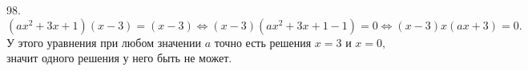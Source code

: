 98. $(ax^2+3x+1)(x-3)=(x-3)\Leftrightarrow (x-3)(ax^2+3x+1-1)=0\Leftrightarrow (x-3)x(ax+3)=0.$ У этого уравнения при любом значении $a$ точно есть решения $x=3$ и $x=0,$ значит одного решения у него быть не может.\\
